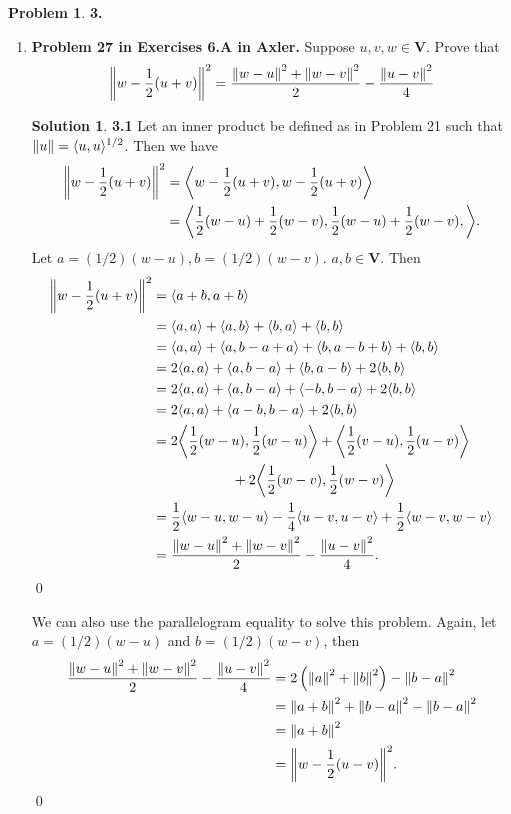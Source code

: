 \documentclass{article}
\theoremstyle{definition}
\newtheorem*{prob*}{Problem}
\newtheorem*{sln*}{Solution}
\newcommand{\V}{\mathbf{V}}
\newcommand{\la}{\langle}
\newcommand{\ra}{\rangle}
\begin{document}
\begin{prob*}\textbf{3.}
	\begin{enumerate}
		\item \textbf{Problem 27 in Exercises 6.A in Axler.} Suppose $u,v,w \in \V$. Prove that
		\begin{align*}
		\norm{w - \frac{1}{2}(u+v)}^2 = \frac{\norm{w-u}^2 + \norm{w-v}^2}{2} - \frac{\norm{u-v}^2}{4}
		\end{align*}
		
		
		
		\begin{sln*}\textbf{3.1} Let an inner product be defined as in Problem 21 such that $\norm{u} = \la u,u \ra^{1/2}$. Then we have
			\begin{align*}
			\norm{w - \frac{1}{2}(u+v)}^2 
			&= \bigg\la w - \frac{1}{2}(u+v) , w - \frac{1}{2}(u+v) \bigg\ra\\
			&= \bigg\la \frac{1}{2}(w-u) + \frac{1}{2}(w-v), \frac{1}{2}(w-u) + \frac{1}{2}(w-v), \bigg\ra.
			\end{align*}
			Let $a = (1/2)(w-u), b = (1/2)(w-v)$. $a,b\in \V$. Then
			\begin{align*}
			\norm{w - \frac{1}{2}(u+v)}^2
			&= \la a+b, a+b \ra\\
			&= \la a,a \ra + \la a,b \ra + \la b,a \ra + \la b,b \ra\\
			&= \la a,a \ra + \la a,b-a +a \ra + \la b,a - b +b  \ra + \la b,b \ra\\
			&= 2\la a,a \ra + \la a,b-a \ra + \la b,a - b  \ra + 2\la b,b \ra\\
			&= 2\la a,a \ra + \la a,b-a \ra + \la -b,b-a  \ra + 2\la b,b \ra\\
			&= 2\la a,a \ra + \la a-b,b-a \ra + 2\la b,b \ra\\
			&= 2\bigg\la \frac{1}{2}(w-u),\frac{1}{2}(w-u) \bigg\ra + \bigg\la \frac{1}{2}(v-u),\frac{1}{2}(u-v) \bigg\ra \\
			&\hspace{2cm}+ 2\bigg\la \frac{1}{2}(w-v),\frac{1}{2}(w-v) \bigg\ra\\
			&= \frac{1}{2}\la w-u,w-u \ra - \frac{1}{4}\la u-v, u-v  \ra + \frac{1}{2}\la w-v ,w-v\ra\\
			&= \frac{\norm{w-u}^2 + \norm{w-v}^2}{2} - \frac{\norm{u-v}^2}{4}.
			\end{align*} \qed
			
			We can also use the parallelogram equality to solve this problem. Again, let $a = (1/2)(w-u)$ and $b = (1/2)(w-v)$, then
			\begin{align*}
			\frac{\norm{w-u}^2 + \norm{w-v}^2}{2} - \frac{\norm{u-v}^2}{4} 
			&= 2\left(\norm{a}^2 + \norm{b}^2 \right) - \norm{b-a}^2\\
			&= \norm{a+b}^2 + \norm{b-a}^2 - \norm{b-a}^2\\
			&= \norm{a+b}^2\\
			&= \norm{w - \frac{1}{2}(u-v)}^2. 
			\end{align*}\qed
			

\end{sln*}
\end{enumerate}
\end{prob*}
\end{document}
